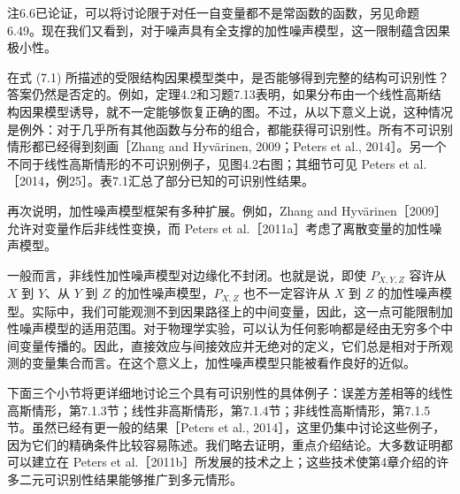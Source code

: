 注6.6已论证，可以将讨论限于对任一自变量都不是常函数的函数，另见命题6.49。现在我们又看到，对于噪声具有全支撑的加性噪声模型，这一限制蕴含因果极小性。

在式 (7.1) 所描述的受限结构因果模型类中，是否能够得到完整的结构可识别性？答案仍然是否定的。例如，定理4.2和习题7.13表明，如果分布由一个线性高斯结构因果模型诱导，就不一定能够恢复正确的图。不过，从以下意义上说，这种情况是例外：对于几乎所有其他函数与分布的组合，都能获得可识别性。所有不可识别情形都已经得到刻画［Zhang and Hyvärinen, 2009；Peters et al., 2014］。另一个不同于线性高斯情形的不可识别例子，见图4.2右图；其细节可见 Peters et al.［2014，例25］。表7.1汇总了部分已知的可识别性结果。



再次说明，加性噪声模型框架有多种扩展。例如，Zhang and Hyvärinen［2009］允许对变量作后非线性变换，而 Peters et al.［2011a］考虑了离散变量的加性噪声模型。

一般而言，非线性加性噪声模型对边缘化不封闭。也就是说，即使 $P_{X,Y,Z}$ 容许从 $X$ 到 $Y$、从 $Y$ 到 $Z$ 的加性噪声模型，$P_{X,Z}$ 也不一定容许从 $X$ 到 $Z$ 的加性噪声模型。实际中，我们可能观测不到因果路径上的中间变量，因此，这一点可能限制加性噪声模型的适用范围。对于物理学实验，可以认为任何影响都是经由无穷多个中间变量传播的。因此，直接效应与间接效应并无绝对的定义，它们总是相对于所观测的变量集合而言。在这个意义上，加性噪声模型只能被看作良好的近似。

下面三个小节将更详细地讨论三个具有可识别性的具体例子：误差方差相等的线性高斯情形，第7.1.3节；线性非高斯情形，第7.1.4节；非线性高斯情形，第7.1.5节。虽然已经有更一般的结果［Peters et al., 2014］，这里仍集中讨论这些例子，因为它们的精确条件比较容易陈述。我们略去证明，重点介绍结论。大多数证明都可以建立在 Peters et al.［2011b］所发展的技术之上；这些技术使第4章介绍的许多二元可识别性结果能够推广到多元情形。

